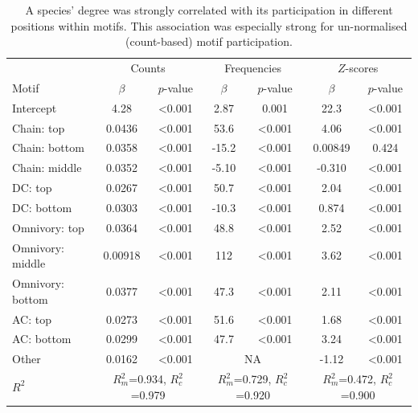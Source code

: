 \documentclass[12pt]{article}
\begin{document}
\begin{spacing}{2.0}
			\begin{table}[h!]
    			\caption{A species' degree was strongly correlated with its participation in different positions within motifs. This association was especially strong for un-normalised (count-based) motif participation.}
    			\label{tab:positions_vs_deg}
    			\begin{tabular}{l | c c | c c | c c}
    			& \multicolumn{2}{c|}{Counts} & \multicolumn{2}{c}{Frequencies} & \multicolumn{2}{|c}{$Z$-scores} \\
    			Motif & $\beta$ & $p$-value & $\beta$ & $p$-value & $\beta$ & $p$-value \\
    			\hline
                Intercept	&	4.28	&	\textless0.001	&	2.87	&	0.001	&	22.3	&	\textless0.001	\\
                Chain: top	&	0.0436	&	\textless0.001	&	53.6	&	\textless0.001	&	4.06	&	\textless0.001	\\
                Chain: bottom	&	0.0358	&	\textless0.001	&	-15.2	&	\textless0.001	&	0.00849	&	0.424	\\
                Chain: middle	&	0.0352	&	\textless0.001	&	-5.10	&	\textless0.001	&	-0.310	&	\textless0.001	\\
                DC: top	&	0.0267	&	\textless0.001	&	50.7	&	\textless0.001	&	2.04	&	\textless0.001	\\
                DC: bottom	&	0.0303	&	\textless0.001	&	-10.3	&	\textless0.001	&	0.874	&	\textless0.001	\\
                Omnivory: top	&	0.0364	&	\textless0.001	&	48.8	&	\textless0.001	&	2.52	&	\textless0.001	\\
                Omnivory: middle	&	0.00918 	&	\textless0.001	&	112	&	\textless0.001	&	3.62	&	\textless0.001	\\
                Omnivory: bottom	&	0.0377	&	\textless0.001	&	47.3	&	\textless0.001	&	2.11	&	\textless0.001	\\
                AC: top	&	0.0273	&	\textless0.001	&	51.6	&	\textless0.001	&	1.68	&	\textless0.001	\\
                AC: bottom	&	0.0299	&	\textless0.001	&	47.7	&	\textless0.001	&	3.24	&	\textless0.001	\\
                Other	&	0.0162	&	\textless0.001	& \multicolumn{2}{c|}{NA} &	-1.12	&	\textless0.001	\\
    			\hline
    			$R^2$ & \multicolumn{2}{c|}{\tiny{$R^2_m$=0.934, $R^2_c$=0.979}} & \multicolumn{2}{c}{\tiny{$R^2_m$=0.729, $R^2_c$=0.920}} & \multicolumn{2}{|c}{\tiny{$R^2_m$=0.472, $R^2_c$=0.900}} \\
    			\hline
                \end{tabular}
                \end{table}



\end{spacing}
\end{document}
